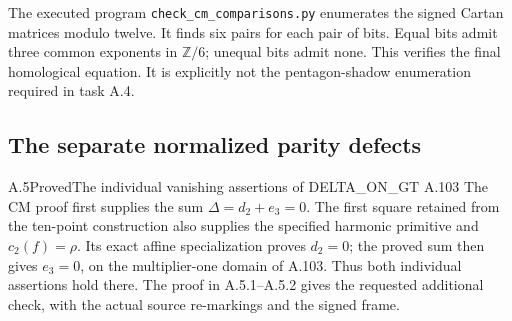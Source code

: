 The executed program \texttt{check\_cm\_comparisons.py} enumerates the signed Cartan matrices modulo twelve. It finds six pairs for each pair of bits. Equal bits admit three common exponents in $\mathbb Z/6$; unequal bits admit none. This verifies the final homological equation. It is explicitly not the pentagon-shadow enumeration required in task A.4.

\subsection{The separate normalized parity defects}
\begin{result}{A.5}{Proved}{The individual vanishing assertions of DELTA\_ON\_GT A.103}
The CM proof first supplies the sum $\Delta=d_2+e_3=0$.
The first square retained from the ten-point construction also
supplies the specified harmonic primitive and $c_2(f)=\rho$.
Its exact affine specialization proves $d_2=0$; the proved
sum then gives $e_3=0$, on the multiplier-one domain of
A.103. Thus both individual assertions hold there. The
proof in A.5.1--A.5.2 gives the requested additional check,
with the actual source re-markings and the signed frame.
\end{result}

